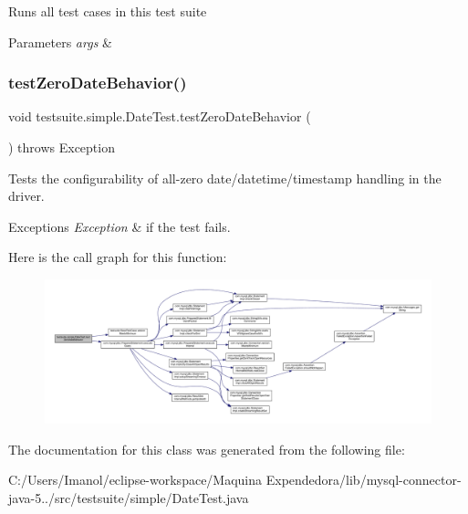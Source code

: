 Runs all test cases in this test suite


\begin{DoxyParams}{Parameters}
{\em args} & \\
\hline
\end{DoxyParams}
\mbox{\label{classtestsuite_1_1simple_1_1_date_test_a65e40a7db246ac9e6d412004a72e4bd4}} 
\subsubsection{\texorpdfstring{test\+Zero\+Date\+Behavior()}{testZeroDateBehavior()}}
{\footnotesize\ttfamily void testsuite.\+simple.\+Date\+Test.\+test\+Zero\+Date\+Behavior (\begin{DoxyParamCaption}{ }\end{DoxyParamCaption}) throws Exception}

Tests the configurability of all-\/zero date/datetime/timestamp handling in the driver.


\begin{DoxyExceptions}{Exceptions}
{\em Exception} & if the test fails. \\
\hline
\end{DoxyExceptions}
Here is the call graph for this function\+:
\nopagebreak
\begin{figure}[H]
\begin{center}
\leavevmode
\includegraphics[width=350pt]{classtestsuite_1_1simple_1_1_date_test_a65e40a7db246ac9e6d412004a72e4bd4_cgraph}
\end{center}
\end{figure}


The documentation for this class was generated from the following file\+:\begin{DoxyCompactItemize}
\item 
C\+:/\+Users/\+Imanol/eclipse-\/workspace/\+Maquina Expendedora/lib/mysql-\/connector-\/java-\/5../src/testsuite/simple/Date\+Test.\+java\end{DoxyCompactItemize}
